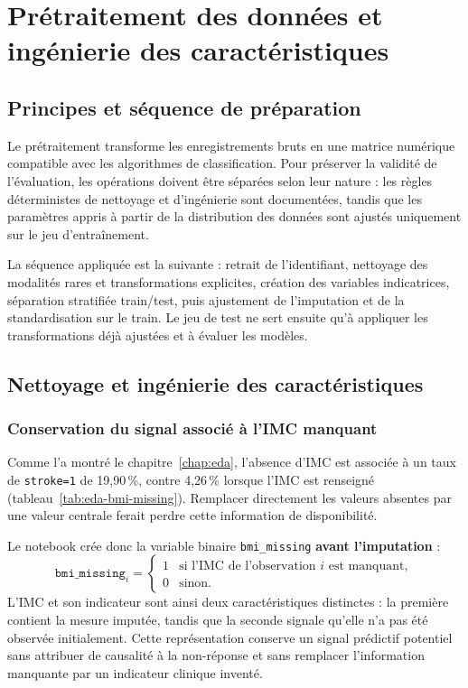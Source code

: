 \chapter{Prétraitement des données et ingénierie des caractéristiques}
\label{chap:preprocessing}
\thispagestyle{plain}

\section{Principes et séquence de préparation}
Le prétraitement transforme les enregistrements bruts en une matrice numérique compatible avec les algorithmes de classification. Pour préserver la validité de l'évaluation, les opérations doivent être séparées selon leur nature : les règles déterministes de nettoyage et d'ingénierie sont documentées, tandis que les paramètres appris à partir de la distribution des données sont ajustés uniquement sur le jeu d'entraînement.

La séquence appliquée est la suivante : retrait de l'identifiant, nettoyage des modalités rares et transformations explicites, création des variables indicatrices, séparation stratifiée train/test, puis ajustement de l'imputation et de la standardisation sur le train. Le jeu de test ne sert ensuite qu'à appliquer les transformations déjà ajustées et à évaluer les modèles.

\section{Nettoyage et ingénierie des caractéristiques}
\subsection{Conservation du signal associé à l'IMC manquant}
Comme l'a montré le chapitre~\ref{chap:eda}, l'absence d'IMC est associée à un taux de \texttt{stroke=1} de 19,90\,\%, contre 4,26\,\% lorsque l'IMC est renseigné (tableau~\ref{tab:eda-bmi-missing}). Remplacer directement les valeurs absentes par une valeur centrale ferait perdre cette information de disponibilité.

Le notebook crée donc la variable binaire \texttt{bmi\_missing} \textbf{avant l'imputation} :
\[
\texttt{bmi\_missing}_i =
\begin{cases}
1 & \text{si l'IMC de l'observation } i \text{ est manquant},\\
0 & \text{sinon.}
\end{cases}
\]
L'IMC et son indicateur sont ainsi deux caractéristiques distinctes : la première contient la mesure imputée, tandis que la seconde signale qu'elle n'a pas été observée initialement. Cette représentation conserve un signal prédictif potentiel sans attribuer de causalité à la non-réponse et sans remplacer l'information manquante par un indicateur clinique inventé.

